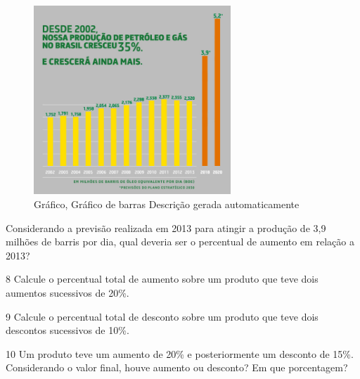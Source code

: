 {{\begin{figure}
\centering
\includegraphics[width=2.91782in,height=2.79636in]{./_SAEB_9_MAT/media/image64.jpg}
\caption{Gráfico, Gráfico de barras Descrição gerada automaticamente}
\end{figure}


Considerando a previsão realizada em 2013 para atingir a produção de 3,9
milhões de barris por dia, qual deveria ser o percentual de aumento em
relação a 2013?


\num{8} Calcule o percentual total de aumento sobre um produto que teve
dois aumentos sucessivos de 20\%.


\num{9} Calcule o percentual total de desconto sobre um produto que teve
dois descontos sucessivos de 10\%.


\num{10} Um produto teve um aumento de 20\% e posteriormente um desconto
de 15\%. Considerando o valor final, houve aumento ou desconto? Em que 
porcentagem?


}}
